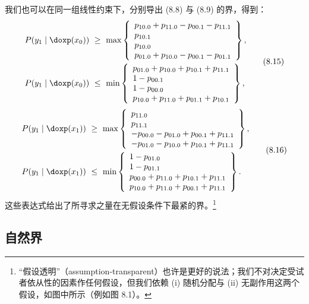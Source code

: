 我们也可以在同一组线性约束下，分别导出 \textup{(8.8)} 与 \textup{(8.9)} 的界，得到：
\begin{equation}
\begin{aligned}
P(y_1\mid\doxp(x_0))&\ \ge\ \max\left\{
\begin{array}{l}
p_{10.0}+p_{11.0}-p_{00.1}-p_{11.1}\\
p_{10.1}\\
p_{10.0}\\
p_{01.0}+p_{10.0}-p_{00.1}-p_{01.1}
\end{array}\right\},\\
P(y_1\mid\doxp(x_0))&\ \le\ \min\left\{
\begin{array}{l}
p_{01.0}+p_{10.0}+p_{10.1}+p_{11.1}\\
1-p_{00.1}\\
1-p_{00.0}\\
p_{10.0}+p_{11.0}+p_{01.1}+p_{10.1}
\end{array}\right\},
\end{aligned} \tag{8.15}
\end{equation}
\begin{equation}
\begin{aligned}
P(y_1\mid\doxp(x_1))&\ \ge\ \max\left\{
\begin{array}{l}
p_{11.0}\\
p_{11.1}\\
-p_{00.0}-p_{01.0}+p_{00.1}+p_{11.1}\\
-p_{01.0}-p_{10.0}+p_{10.1}+p_{11.1}
\end{array}\right\},\\
P(y_1\mid\doxp(x_1))&\ \le\ \min\left\{
\begin{array}{l}
1-p_{01.0}\\
1-p_{01.1}\\
p_{00.0}+p_{11.0}+p_{10.1}+p_{11.1}\\
p_{10.0}+p_{11.0}+p_{00.1}+p_{11.1}
\end{array}\right\}.
\end{aligned} \tag{8.16}
\end{equation}
这些表达式给出了所寻求之量在无假设条件下最紧的界。\footnote{“假设透明”（assumption-transparent）也许是更好的说法；我们不对决定受试者依从性的因素作任何假设，但我们依赖 (i) 随机分配与 (ii) 无副作用这两个假设，如图中所示（例如图 8.1）。}

\subsection{自然界}

